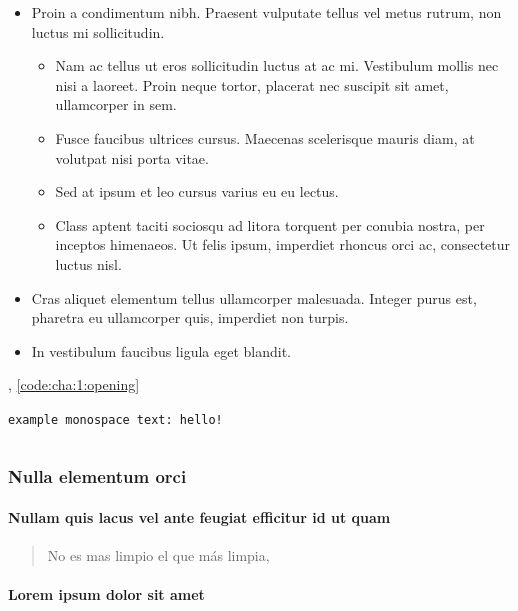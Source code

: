 \begin{itemize}
    \item Proin a condimentum nibh. Praesent vulputate tellus vel metus rutrum, non luctus mi sollicitudin. 
    \begin{itemize}
        \item Nam ac tellus ut eros sollicitudin luctus at ac mi. Vestibulum mollis nec nisi a laoreet. Proin neque tortor, placerat nec suscipit sit amet, ullamcorper in sem.
        \item Fusce faucibus ultrices cursus. Maecenas scelerisque mauris diam, at volutpat nisi porta vitae. 
        \item Sed at ipsum et leo cursus varius eu eu lectus. 
        \item Class aptent taciti sociosqu ad litora torquent per conubia nostra, per inceptos himenaeos. Ut felis ipsum, imperdiet rhoncus orci ac, consectetur luctus nisl. 
    \end{itemize}
    \item Cras aliquet elementum tellus ullamcorper malesuada. Integer purus est, pharetra eu ullamcorper quis, imperdiet non turpis.
    \item In vestibulum faucibus ligula eget blandit. 
\end{itemize}

\lipsum[22], \autoref{code:cha:1:opening} \lipsum[23]

\texttt{example monospace text: hello!}

\begin{code}
    \label{code:cha:1:opening}
    \inputminted[]{tex}{main.tex}
\end{code}

\subsubsection{Nulla elementum orci}

\paragraph{Nullam quis lacus vel ante feugiat efficitur id ut quam}

\lipsum[23]

\begin{quotation}
    No es mas limpio el que más limpia,
\end{quotation}

\paragraph{Lorem ipsum dolor sit amet}

